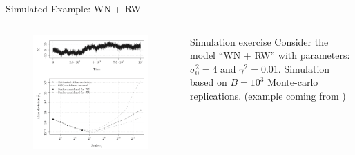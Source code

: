 \documentclass[envcountsect,usenames,dvipsnames]{beamer}
\theoremstyle{mystyle}
\begin{document}
\begin{frame}{Simulated Example: WN + RW}
	 \begin{columns}
		\begin{column}{0.6\textwidth}
			\vspace{0.3cm}
			\begin{figure}
				\vspace{-0.8cm}
			    \centering
    \includegraphics[scale=0.30, valign=t]{Images/AVWWWWWW.png}
			\end{figure}
		\end{column}
		\begin{column}{0.35\textwidth}
			\begin{block}{Simulation exercise}
Consider the model ``WN + RW'' with parameters: $\sigma^2_0 = 4$ and $\gamma^2 = 0.01$. Simulation based on $B = 10
^3$ Monte-carlo replications. (example coming from \cite{guerrier2016theoretical})
            \end{block}
		\end{column}
	\end{columns}
\end{frame}
\end{document}
